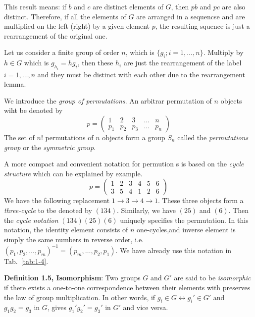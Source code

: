 This result means: if $b$ and $c$ are distinct elements of $G$, then $pb$ and $pc$ are also distinct.
Therefore, if all the elements of $G$ are arranged in a sequencse and are multiplied on the left (right) by a given element $p$, the resulting squence is just a rearrangement of the original one.

Let us consider a finite group of order $n$, which is $\{g_{i}; i = 1,\dots, n\}$.
Multiply by $h\in G$ which is $g_{h_{i}} = hg_{i}$, then these $h_{i}$ are just the rearrangement of the label $i = 1, \dots, n$ and they must be distinct with each other due to the rearrangement lemma.

We introduce the \textit{group of permutations}.
An arbitrar permutation of $n$ objects wiht be denoted by
\begin{equation*}
  p =
  \begin{pmatrix}
    1 & 2 & 3 & \dots & n \\
    p_{1} & p_{2} & p_{3} & \dots & p_{n}
  \end{pmatrix}
\end{equation*}
The set of $n!$ permutations of $n$ objects form a group $S_{n}$ called the \textit{permutations group} or the \textit{symmetric group}.

A more compact and convenient notation for permution s is based on the \textit{cycle structure} which can be explained by example.
\begin{equation*}
  p =
  \begin{pmatrix}
    1 & 2 & 3 & 4 & 5 & 6 \\
    3 & 5 & 4 & 1 & 2 & 6
  \end{pmatrix}
\end{equation*}
We have the following replacement $1 \to 3 \to 4 \to 1$.
These three objects form a \textit{three-cycle} to tbe denoted by $\left(134\right)$.
Similarly, we have $\left(25\right)$ and $\left(6\right)$.
Then the \textit{cycle notation} $\left(134\right) \left(25\right) \left(6\right)$ uniquely specifies the permutation.
In this notation, the identity element consists of $n$ one-cycles,and inverse element is simply the same numbers in reverse order, i.e. $\left(p_{1}, p_{2}, \dots, p_{m} \right)^{-1} = \left(p_{m}, \dots, p_{2}, p_{1}\right)$.
We have already use this notation in Tab.~\ref{tab:1-4}.

\textbf{Definition 1.5, Isomorphism}: Two groups $G$ and $G'$ are said to be \textit{isomorphic} if there exists a one-to-one correspondence between their elements with preserves the law of group multiplication.
In other words, if $g_{i} \in G \leftrightarrow g_{i}' \in G'$ and $g_{1}g_{2} = g_{3}$ in $G$, gives $g_{1}'g_{2}'= g_{3}'$ in $G'$ and vice versa.

